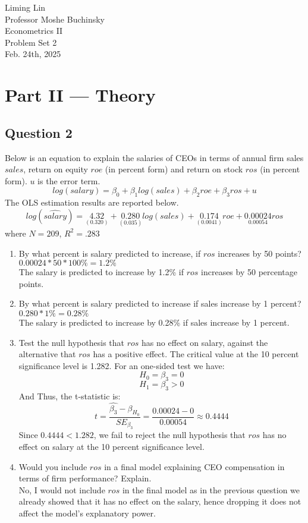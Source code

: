 \documentclass[12pt]{article}
\begin{document}
\begin{flushleft}
Liming Lin\\
Professor Moshe Buchinsky\\
Econometrics II\\
Problem Set 2\\
Feb. 24th, 2025\\

\section*{Part II --- Theory}
\subsection*{Question 2}
Below is an equation to explain the salaries of CEOs in terms of annual firm sales $sales$, return on equity $roe$ (in percent form) and return on stock $ros$ (in percent form). $u$ is the error term.
\[
log(salary)=\beta_0+\beta_1log(sales)+\beta_2roe+\beta_3ros+u
\]
The OLS estimation results are reported below.
\[
log(\hat{salary})=\underset{(0.320)}{4.32}+\underset{(0.035)}{0.280}log(sales)+\underset{(0.0041)}{0.174}roe+\underset{0.00054}{0.00024}ros
\]
where $N=209$, $R^2=.283$
\begin{enumerate}
    \item By what percent is salary predicted to increase, if $ros$ increases by 50 points?
    $0.00024*50*100\%=1.2\%$\\
    The salary is predicted to increase by 1.2\% if $ros$ increases by 50 percentage points.\\
    \item By what percent is salary predicted to increase if sales increase by 1 percent?
    $0.280*1\%=0.28\%$\\
    The salary is predicted to increase by 0.28\% if sales increase by 1 percent.\\
    \item Test the null hypothesis that $ros$ has no effect on salary, against the alternative that $ros$ has a positive effect. The critical value at the 10 percent significance level is 1.282.
    For an one-sided test we have:
    \[H_0=\beta_3=0\]
    \[H_1=\beta_3>0\]
    And Thus, the t-statistic is:
    \[t=\frac{\hat{\beta_3}-\beta_{H_0}}{SE_{\beta_3}}=\frac{0.00024-0}{0.00054}\approx 0.4444\]
    Since $0.4444<1.282$, we fail to reject the null hypothesis that $ros$ has no effect on salary at the 10 percent significance level.\\
    \item Would you include $ros$ in a final model explaining CEO compensation in terms of firm performance? Explain.\\
    No, I would not include $ros$ in the final model as in the previous question we already showed that it has no effect on the salary, hence dropping it does not affect the model's explanatory power.\\
\end{enumerate}

\end{flushleft}
\end{document}
